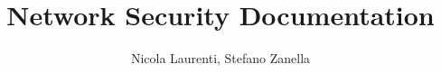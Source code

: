 \title{Network Security Documentation}
\author{Nicola Laurenti, Stefano Zanella}

\ifpdf
\maketitle
\fi
